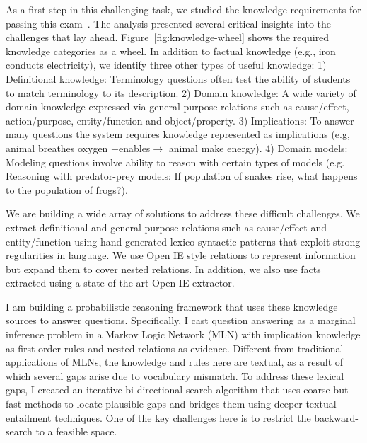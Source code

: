 \documentclass[a4paper,11pt,onecolumn]{article}
\newcommand{\eat}[1]{}
\begin{document}
As a first step in this challenging task, we studied the knowledge requirements for passing this exam~\cite{clark-akbc13}. The analysis presented several critical insights into the challenges that lay ahead. Figure~\ref{fig:knowledge-wheel} shows the required knowledge categories as a wheel. In addition to factual knowledge (e.g., iron conducts electricity), we identify three other types of useful knowledge: 1) Definitional knowledge: Terminology questions often test the ability of students to match terminology to its description. 2) Domain knowledge: A wide variety of domain knowledge expressed via general purpose relations such as cause/effect, action/purpose, entity/function and object/property. 3) Implications: To answer many questions the system requires knowledge represented as implications (e.g, animal breathes oxygen $-$enables$\rightarrow$ animal make energy). 4) Domain models: Modeling questions involve ability to reason with certain types of models (e.g. Reasoning with predator-prey models: If population of snakes rise, what happens to the population of frogs?). 

We are building a wide array of solutions to address these difficult challenges. We extract definitional and general purpose relations such as cause/effect and entity/function using hand-generated lexico-syntactic patterns that exploit strong regularities in language. We use Open IE style relations to represent information but expand them to cover nested relations. In addition, we also use facts extracted using a state-of-the-art Open IE extractor.

I am building a probabilistic reasoning framework that uses these knowledge sources to answer questions. Specifically, I cast question answering as a marginal inference problem in a Markov Logic Network (MLN) with implication knowledge as first-order rules and nested relations as evidence. Different from traditional applications of MLNs, the knowledge and rules here are textual, as a result of which several gaps arise due to vocabulary mismatch. To address these lexical gaps, I created an iterative bi-directional search algorithm that uses coarse but fast methods to locate plausible gaps and bridges them using deeper textual entailment techniques. One of the key challenges here is to restrict the backward-search to a feasible space. 

\eat{For acquiring definitional knowledge we exploit the strong regularities in definitional language to produce open ie style relations representing the definition. A typical definition includes the class or semantic type information about the term and one or more {\em definitional} properties. We used a handful of patterns covered 50\% of the definitions mined from the web at a high precision. For extracting domain knowledge, we use hand-generated dependency patterns to extract general purpose relations such as cause/effect. I am cure
}
\end{document}
